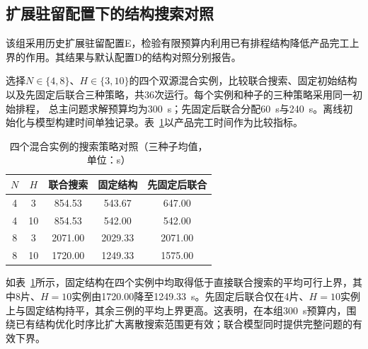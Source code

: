 \subsection{扩展驻留配置下的结构搜索对照}
\label{sec:structure-comparison-cn}

该组采用历史扩展驻留配置E，检验有限预算内利用已有排程结构降低产品完工上界的作用。其结果与默认配置D的结构对照分别报告。

选择$N\in\{4,8\}$、$H\in\{3,10\}$的四个双源混合实例，比较联合搜索、固定初始结构以及先固定后联合三种策略，共36次运行。每个实例和种子的三种策略采用同一初始排程，
总主问题求解预算均为300~s；先固定后联合分配60~s与240~s。离线初始化与模型构建时间单独记录。表~\ref{tab:structure-ablation-cn}以产品完工时间作为比较指标。

\begin{table}[!htbp]
\centering\small
\caption{四个混合实例的搜索策略对照（三种子均值，单位：s）}
\label{tab:structure-ablation-cn}
\begin{tabular}{ccccc}\toprule
$N$ & $H$ & 联合搜索 & 固定结构 & 先固定后联合\\\midrule
4 & 3 & 854.53 & 543.67 & 647.00\\
4 & 10 & 854.53 & 542.00 & 542.00\\
8 & 3 & 2071.00 & 2029.33 & 2071.00\\
8 & 10 & 1720.00 & 1249.33 & 1575.00\\
\bottomrule\end{tabular}
\end{table}

如表~\ref{tab:structure-ablation-cn}所示，固定结构在四个实例中均取得低于直接联合搜索的平均可行上界，其中8片、$H=10$实例由1720.00降至1249.33~s。先固定后联合仅在4片、$H=10$实例上与固定结构持平，其余三例的平均上界更高。这表明，在本组300~s预算内，围绕已有结构优化时序比扩大离散搜索范围更有效；联合模型同时提供完整问题的有效下界。


